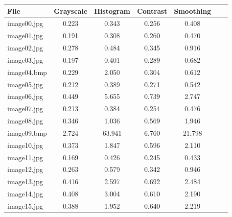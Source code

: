 \documentclass[11pt,a4paper]{article}
\begin{document}
\begin{tabular}{ | l | S | S | S | S | S | S | }
	\hline
	\textbf{File} & \textbf{Grayscale} & \textbf{Histogram} & \textbf{Contrast} & \textbf{Smoothing} \\
	\hline
	image00.jpg & 0.223 & 0.343 & 0.256 & 0.408 \\
	\hline
	image01.jpg & 0.191 & 0.308 & 0.260 & 0.470 \\
	\hline
	image02.jpg & 0.278 & 0.484 & 0.345 & 0.916 \\
	\hline
	image03.jpg & 0.197 & 0.401 & 0.289 & 0.682 \\
	\hline
	image04.bmp & 0.229 & 2.050 & 0.304 & 0.612 \\
	\hline
	image05.jpg & 0.212 & 0.389 & 0.271 & 0.542 \\
	\hline
	image06.jpg & 0.449 & 5.655 & 0.739 & 2.747 \\
	\hline
	image07.jpg & 0.213 & 0.384 & 0.254 & 0.476 \\
	\hline
	image08.jpg & 0.346 & 1.036 & 0.569 & 1.946 \\
	\hline
	image09.bmp & 2.724 & 63.941 & 6.760 & 21.798 \\
	\hline
	image10.jpg & 0.373 & 1.847 & 0.596 & 2.110 \\
	\hline
	image11.jpg & 0.169 & 0.426 & 0.245 & 0.433 \\
	\hline
	image12.jpg & 0.263 & 0.579 & 0.342 & 0.946 \\
	\hline
	image13.jpg & 0.416 & 2.597 & 0.692 & 2.484 \\
	\hline
	image14.jpg & 0.408 & 3.004 & 0.610 & 2.190 \\
	\hline
	image15.jpg & 0.388 & 1.952 & 0.640 & 2.219 \\
	\hline
\end{tabular} \\
\end{document}
